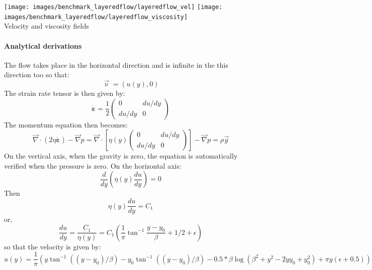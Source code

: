 \begin{center}
\texttt{[image: images/benchmark\_layeredflow/layeredflow\_vel]}
\texttt{[image: images/benchmark\_layeredflow/layeredflow\_viscosity]}\\
{\captionfont Velocity and viscosity fields}
\end{center}

\paragraph{Analytical derivations} 
The flow takes place in the horizontal direction and is infinite in the this direction too so that:
\[
\vec\upnu=(u(y),0)
\]
The strain rate tensor is then given by:
\[
\dot{\bm \varepsilon}=
\frac{1}{2}
\left(
\begin{array}{cc}
0 & du/dy \\
du/dy & 0
\end{array}
\right)
\]
The momentum equation then becomes:
\[
{\vec \nabla} \cdot (2 \eta \dot{\bm \varepsilon} ) -{\vec \nabla}p 
=
{\vec \nabla} \cdot \left[ \eta(y) 
\left(
\begin{array}{cc}
0 & du/dy \\
du/dy & 0
\end{array}
\right)
\right] -{\vec \nabla}p 
= \rho {\vec g}
\]
On the vertical axis, when the gravity is zero, the equation is automatically verified when the 
pressure is zero.
On the horizontal axis:
\[
\frac{d}{dy} \left(\eta(y) \frac{du}{dy} \right) = 0
\]
Then 
\[
\eta(y) \frac{du}{dy}  = C_1
\]
or,
\[
\frac{du}{dy}  = \frac{C_1}{\eta(y)} = C_1 \left(\frac{1}{\pi} \tan^{-1} \frac{y-y_0}{\beta} 
+ 1/2 + \epsilon\right)
\]
so that the velocity is given by:
\[
u(y) = \frac{1}{\pi} ( y \tan^{-1}((y-y_0)/\beta) - y_0 \tan^{-1}((y-y_0)/\beta)  
-0.5* \beta \log (\beta^2 + y^2 - 2 y y_0 +y_0^2) + \pi y (\epsilon +0.5)) 
\]

